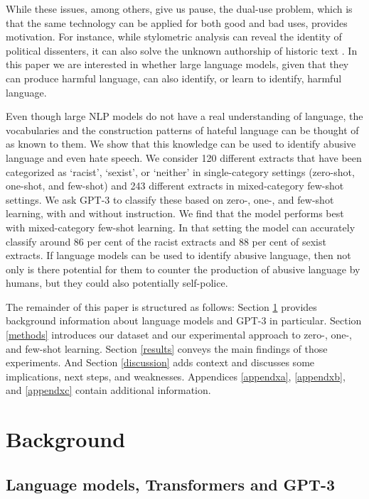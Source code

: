 \documentclass[12pt,]{article}
\begin{document}
While these issues, among others, give us pause, the dual-use problem, which is that the same technology can be applied for both good and bad uses, provides motivation. For instance, while stylometric analysis can reveal the identity of political dissenters, it can also solve the unknown authorship of historic text \citep{hovy2016social}. In this paper we are interested in whether large language models, given that they can produce harmful language, can also identify, or learn to identify, harmful language.

Even though large NLP models do not have a real understanding of language, the vocabularies and the construction patterns of hateful language can be thought of as known to them. We show that this knowledge can be used to identify abusive language and even hate speech. We consider 120 different extracts that have been categorized as `racist', `sexist', or `neither' in single-category settings (zero-shot, one-shot, and few-shot) and 243 different extracts in mixed-category few-shot settings. We ask GPT-3 to classify these based on zero-, one-, and few-shot learning, with and without instruction. We find that the model performs best with mixed-category few-shot learning. In that setting the model can accurately classify around 86 per cent of the racist extracts and 88 per cent of sexist extracts. If language models can be used to identify abusive language, then not only is there potential for them to counter the production of abusive language by humans, but they could also potentially self-police.

The remainder of this paper is structured as follows: Section \ref{background} provides background information about language models and GPT-3 in particular. Section \ref{methods} introduces our dataset and our experimental approach to zero-, one-, and few-shot learning. Section \ref{results} conveys the main findings of those experiments. And Section \ref{discussion} adds context and discusses some implications, next steps, and weaknesses. Appendices \ref{appendxa}, \ref{appendxb}, and \ref{appendxc} contain additional information.

\hypertarget{background}{%
\section{Background}\label{background}}

\hypertarget{language-models-transformers-and-gpt-3}{%
\subsection{Language models, Transformers and GPT-3}\label{language-models-transformers-and-gpt-3}}
\end{document}
